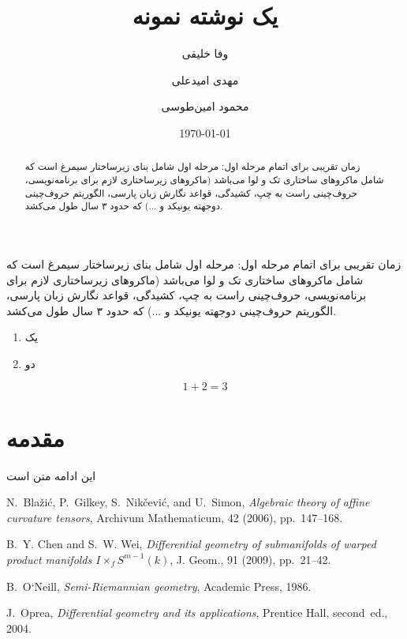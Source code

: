 \documentclass{imsproc}
\title{یک نوشته نمونه}
\author{وفا خلیقی}
\author{مهدی امیدعلی}
\author{محمود امین‌طوسی}
\date{\today}
\begin{document}
\begin{abstract}
زمان تقریبی برای اتمام مرحله اول: مرحله اول شامل بنای زیرساختار سیمرغ است که شامل ماکروهای ساختاری تک و لوا می‌باشد (ماکروهای زیرساختاری لازم برای برنامه‌نویسی، حروف‌چینی راست به چپ، کشیدگی، قواعد نگارش زبان پارسی، الگوریتم حروف‌چینی دوجهته یونیکد و ...) که حدود ۳ سال طول می‌کشد.
\end{abstract}
\maketitle
\tableofcontents
{}
زمان تقریبی برای اتمام مرحله اول: مرحله اول شامل بنای زیرساختار سیمرغ است که شامل ماکروهای ساختاری تک و لوا می‌باشد (ماکروهای زیرساختاری لازم برای برنامه‌نویسی، حروف‌چینی راست به چپ، کشیدگی، قواعد نگارش زبان پارسی، الگوریتم حروف‌چینی دوجهته یونیکد و ...) که حدود ۳ سال طول می‌کشد. 
\begin{enumerate}
\item
یک
\item
دو
\end{enumerate}
\begin{equation}
1+2=3
\end{equation}
\section{مقدمه}
\newpage

این ادامه متن است
\setLTRbibitems
\begin{thebibliography}{99}%
\resetlatinfont

 N.~Bla\v{z}i\'c, P.~Gilkey, S.~Nik\v{c}evi\'c, and U.~Simon, {\em
  Algebraic theory of affine curvature tensors}, Archivum Mathematicum, 42
  (2006), pp.~147--168.

 B.~Y. Chen and S.~W. Wei, {\em Differential geometry of submanifolds of
  warped product manifolds {$I\times_fS^{m-1}(k)$}}, J. Geom., 91 (2009),
  pp.~21--42.

 B.~O`Neill, {\em Semi-{Riemannian geometry}}, Academic Press, 1986.

 J.~Oprea, {\em Differential geometry and its applications}, Prentice
  Hall, second~ed., 2004.

\end{thebibliography}
\end{document}
